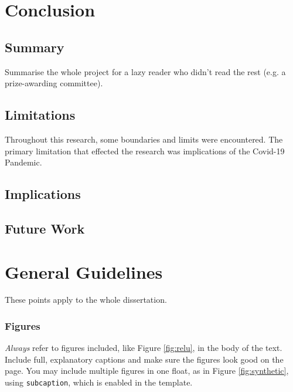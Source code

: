 \documentclass{l4proj}
\begin{document}


\chapter{Conclusion}  
\section{Summary}
Summarise the whole project for a lazy reader who didn't read the rest (e.g. a prize-awarding committee).

\section{Limitations}
Throughout this research, some boundaries and limits were encountered. The primary limitation that effected the research was implications of the Covid-19 Pandemic. 

\section{Implications}

\section{Future Work}


\chapter{General Guidelines}

These points apply to the whole dissertation.

\subsection{Figures}
\emph{Always} refer to figures included, like Figure \ref{fig:relu}, in the body of the text. Include full, explanatory captions and make sure the figures look good on the page.
You may include multiple figures in one float, as in Figure \ref{fig:synthetic}, using \texttt{subcaption}, which is enabled in the template.
\end{document}
